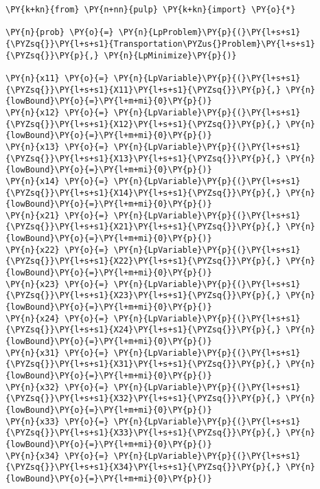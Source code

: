     \begin{tcolorbox}[breakable, size=fbox, boxrule=1pt, pad at break*=1mm,colback=cellbackground, colframe=cellborder]
\begin{Verbatim}[commandchars=\\\{\}]
\PY{k+kn}{from} \PY{n+nn}{pulp} \PY{k+kn}{import} \PY{o}{*}

\PY{n}{prob} \PY{o}{=} \PY{n}{LpProblem}\PY{p}{(}\PY{l+s+s1}{\PYZsq{}}\PY{l+s+s1}{Transportation\PYZus{}Problem}\PY{l+s+s1}{\PYZsq{}}\PY{p}{,} \PY{n}{LpMinimize}\PY{p}{)}

\PY{n}{x11} \PY{o}{=} \PY{n}{LpVariable}\PY{p}{(}\PY{l+s+s1}{\PYZsq{}}\PY{l+s+s1}{X11}\PY{l+s+s1}{\PYZsq{}}\PY{p}{,} \PY{n}{lowBound}\PY{o}{=}\PY{l+m+mi}{0}\PY{p}{)}
\PY{n}{x12} \PY{o}{=} \PY{n}{LpVariable}\PY{p}{(}\PY{l+s+s1}{\PYZsq{}}\PY{l+s+s1}{X12}\PY{l+s+s1}{\PYZsq{}}\PY{p}{,} \PY{n}{lowBound}\PY{o}{=}\PY{l+m+mi}{0}\PY{p}{)}
\PY{n}{x13} \PY{o}{=} \PY{n}{LpVariable}\PY{p}{(}\PY{l+s+s1}{\PYZsq{}}\PY{l+s+s1}{X13}\PY{l+s+s1}{\PYZsq{}}\PY{p}{,} \PY{n}{lowBound}\PY{o}{=}\PY{l+m+mi}{0}\PY{p}{)}
\PY{n}{x14} \PY{o}{=} \PY{n}{LpVariable}\PY{p}{(}\PY{l+s+s1}{\PYZsq{}}\PY{l+s+s1}{X14}\PY{l+s+s1}{\PYZsq{}}\PY{p}{,} \PY{n}{lowBound}\PY{o}{=}\PY{l+m+mi}{0}\PY{p}{)}
\PY{n}{x21} \PY{o}{=} \PY{n}{LpVariable}\PY{p}{(}\PY{l+s+s1}{\PYZsq{}}\PY{l+s+s1}{X21}\PY{l+s+s1}{\PYZsq{}}\PY{p}{,} \PY{n}{lowBound}\PY{o}{=}\PY{l+m+mi}{0}\PY{p}{)}
\PY{n}{x22} \PY{o}{=} \PY{n}{LpVariable}\PY{p}{(}\PY{l+s+s1}{\PYZsq{}}\PY{l+s+s1}{X22}\PY{l+s+s1}{\PYZsq{}}\PY{p}{,} \PY{n}{lowBound}\PY{o}{=}\PY{l+m+mi}{0}\PY{p}{)}
\PY{n}{x23} \PY{o}{=} \PY{n}{LpVariable}\PY{p}{(}\PY{l+s+s1}{\PYZsq{}}\PY{l+s+s1}{X23}\PY{l+s+s1}{\PYZsq{}}\PY{p}{,} \PY{n}{lowBound}\PY{o}{=}\PY{l+m+mi}{0}\PY{p}{)}
\PY{n}{x24} \PY{o}{=} \PY{n}{LpVariable}\PY{p}{(}\PY{l+s+s1}{\PYZsq{}}\PY{l+s+s1}{X24}\PY{l+s+s1}{\PYZsq{}}\PY{p}{,} \PY{n}{lowBound}\PY{o}{=}\PY{l+m+mi}{0}\PY{p}{)}
\PY{n}{x31} \PY{o}{=} \PY{n}{LpVariable}\PY{p}{(}\PY{l+s+s1}{\PYZsq{}}\PY{l+s+s1}{X31}\PY{l+s+s1}{\PYZsq{}}\PY{p}{,} \PY{n}{lowBound}\PY{o}{=}\PY{l+m+mi}{0}\PY{p}{)}
\PY{n}{x32} \PY{o}{=} \PY{n}{LpVariable}\PY{p}{(}\PY{l+s+s1}{\PYZsq{}}\PY{l+s+s1}{X32}\PY{l+s+s1}{\PYZsq{}}\PY{p}{,} \PY{n}{lowBound}\PY{o}{=}\PY{l+m+mi}{0}\PY{p}{)}
\PY{n}{x33} \PY{o}{=} \PY{n}{LpVariable}\PY{p}{(}\PY{l+s+s1}{\PYZsq{}}\PY{l+s+s1}{X33}\PY{l+s+s1}{\PYZsq{}}\PY{p}{,} \PY{n}{lowBound}\PY{o}{=}\PY{l+m+mi}{0}\PY{p}{)}
\PY{n}{x34} \PY{o}{=} \PY{n}{LpVariable}\PY{p}{(}\PY{l+s+s1}{\PYZsq{}}\PY{l+s+s1}{X34}\PY{l+s+s1}{\PYZsq{}}\PY{p}{,} \PY{n}{lowBound}\PY{o}{=}\PY{l+m+mi}{0}\PY{p}{)}


\end{Verbatim}
\end{tcolorbox}
